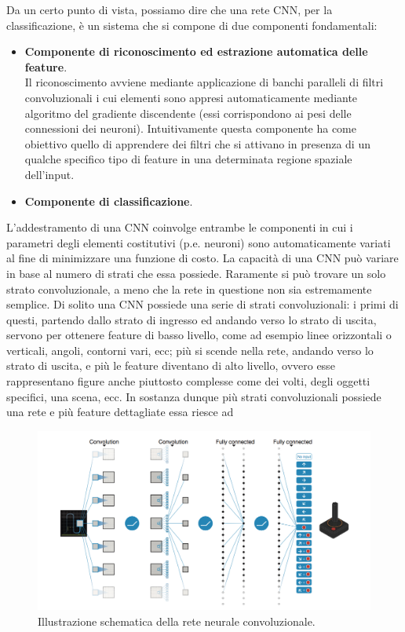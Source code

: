 \documentclass[twoside,twocolumn,10pt]{extarticle}
\theoremstyle{definition}
\begin{document}
Da un certo punto di vista, possiamo dire che una rete CNN, per la classificazione, è un sistema che si compone di due componenti fondamentali:
\begin{itemize}
	\item 
	\textbf{Componente di riconoscimento ed estrazione automatica delle feature}. \\Il riconoscimento avviene mediante applicazione di banchi paralleli di filtri convoluzionali i cui elementi sono appresi automaticamente mediante algoritmo del gradiente discendente (essi corrispondono ai pesi delle connessioni dei neuroni). Intuitivamente questa componente ha come obiettivo quello di apprendere dei filtri che si attivano in presenza di un qualche specifico tipo di feature in una determinata regione spaziale dell’input.
	\item
	\textbf{Componente di classificazione}.
\end{itemize}
L’addestramento di una CNN coinvolge entrambe le componenti in cui i parametri degli elementi costitutivi (p.e. neuroni) sono automaticamente variati al fine di minimizzare una funzione di costo.
La capacità di una CNN può variare in base al numero di strati che essa possiede. Raramente si può trovare un solo strato convoluzionale, a meno che la rete in questione non sia estremamente semplice. Di solito una CNN possiede una serie di strati convoluzionali: i primi di questi, partendo dallo strato di ingresso ed andando verso lo strato di uscita, servono per ottenere feature di basso livello, come ad esempio linee orizzontali o verticali, angoli, contorni vari, ecc; più si scende nella rete, andando verso lo strato di uscita, e più le feature diventano di alto livello, ovvero esse rappresentano figure anche piuttosto complesse come dei volti, degli oggetti specifici, una scena, ecc. In sostanza dunque più strati convoluzionali possiede una rete e più feature dettagliate essa riesce ad 

\begin{figure}[h]
	\centering
	\includegraphics[scale=.2]{images/cnnDQN.jpg}
	\caption{Illustrazione schematica della rete neurale convoluzionale.}
	\label{fig:cnnDQN}
\end{figure}
\end{document}
